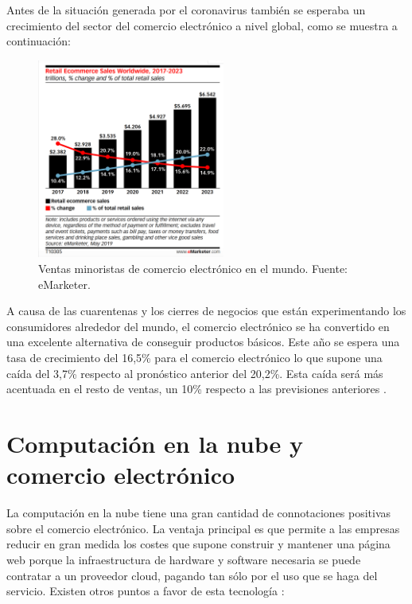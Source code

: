 Antes de la situación generada por el coronavirus también se esperaba un crecimiento del sector del comercio electrónico a nivel global, como se muestra a continuación:

\begin{figure}[ht]
	\begin{center}
		\includegraphics[width = 0.55\textwidth]{Figuras/Global-online-retail-e-commerce-growth.png}
	\end{center}
	\caption{\label{fig:retailWorldwide} Ventas minoristas de comercio electrónico en el mundo. Fuente: eMarketer.}
\end{figure}

A causa de las cuarentenas y los cierres de negocios que están experimentando los consumidores alrededor del mundo, el comercio electrónico se ha convertido en una excelente alternativa de conseguir productos básicos. Este año se espera una tasa de crecimiento  del 16,5\% para el comercio electrónico lo que supone una caída del 3,7\% respecto al pronóstico anterior del 20,2\%. Esta caída será más acentuada en el resto de ventas, un 10\% respecto a las previsiones anteriores . 

\newpage

\section{Computación en la nube y comercio electrónico}

La computación en la nube tiene una gran cantidad de connotaciones positivas sobre el comercio electrónico. La ventaja principal es que permite a las empresas reducir en gran medida los costes que supone construir y mantener una página web porque la infraestructura de hardware y software necesaria se puede contratar a un proveedor cloud, pagando tan sólo por el uso que se haga del servicio. Existen otros puntos a favor de esta tecnología \cite{SME}:

